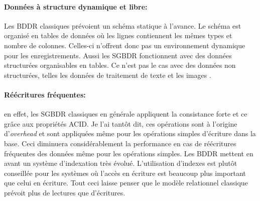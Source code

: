\paragraph{Données à structure dynamique et libre:} Les 
\textsf{BDDR} classiques prévoient un schéma statique à 
l'avance. Le schéma est organisé en tables de données où les lignes
contiennent les mêmes types et nombre de colonnes. Celles-ci n'offrent
donc pas un environnement dynamique pour les enregistrements. Aussi
les \textsf{SGBDR} fonctionnent avec des données structurées
organisables en tables.  Ce n'est pas le cas avec des données non
structurées, telles les données de traitement de texte et les images
\cite{NealLeavitt}.

\paragraph{Réécritures fréquentes:}  en effet, les \textsf{SGBDR} classiques en générale
appliquent la consistance forte et ce grâce aux propriétés \textsf{ACID}. 
Je l'ai tantôt dit, ces opérations sont à l'origine d'\textit{overhead} 
et sont appliquées même pour les opérations simples d'écriture dans la base. Ceci diminuera
considérablement la performance en cas de réécritures fréquentes des données même pour
les opérations simples.
Les \textsf{BDDR} mettent en avant un système d'indexation très évolué. L'utilisation
d'indexes est plutôt conseillée pour les systèmes où l'accès en écriture est
beaucoup plus important que celui en écriture. Tout ceci laisse penser que le modèle relationnel
classique prévoit plus de lectures que d'écritures. 

